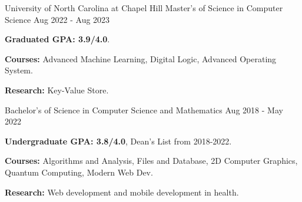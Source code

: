 

\begin{cventries}

    \cvedentry
      {University of North Carolina at Chapel Hill} %
      {Master's of Science in Computer Science } %
      {Aug 2022 - Aug 2023}
      {
        \begin{cvitems} %
          \item {\textbf{Graduated GPA: 3.9/4.0}. }
          \item {\textbf{Courses:} Advanced Machine Learning, Digital Logic, Advanced Operating System.}
          \item {\textbf{Research:} Key-Value Store.}
        \end{cvitems}
      }
      {Bachelor's of Science in Computer Science and Mathematics} %
      {Aug 2018 - May 2022} %
      {
        \begin{cvitems} %
          \item {\textbf{Undergraduate GPA: 3.8/4.0}, Dean's List from 2018-2022.}
          \item {\textbf{Courses:} Algorithms and Analysis, Files and Database, 2D Computer Graphics, Quantum Computing, Modern Web Dev.}
          \item {\textbf{Research:} Web development and mobile development in health.}
        \end{cvitems}
      }


\end{cventries}

